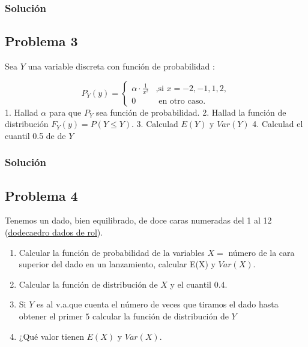 \documentclass[
]{article}
\providecommand{\tightlist}{%
  \setlength{\itemsep}{0pt}\setlength{\parskip}{0pt}}
\begin{document}
\hypertarget{soluciuxf3n-1}{%
\subsubsection{Solución}\label{soluciuxf3n-1}}

\hypertarget{problema-3}{%
\subsection{Problema 3}\label{problema-3}}

Sea \(Y\) una variable discreta con función de probabilidad :

\[
P_Y(y)=
\left\{\begin{array}{ll}
\alpha\cdot\frac{1}{x^2} & \mbox{,si } x=-2,-1,1,2,
 \\
0 & \mbox{ en otro caso}.
\end{array}\right. 
\] 1. Hallad \(\alpha\) para que \(P_Y\) sea función de probabilidad. 2.
Hallad la función de distribución \(F_Y(y)=P(Y\leq Y)\). 3. Calculad
\(E(Y)\) y \(Var(Y)\) 4. Calculad el cuantil 0.5 de de \(Y\)

\hypertarget{soluciuxf3n-2}{%
\subsubsection{Solución}\label{soluciuxf3n-2}}

\hypertarget{problema-4}{%
\subsection{Problema 4}\label{problema-4}}

Tenemos un dado, bien equilibrado, de doce caras numeradas del 1 al 12
(\href{https://es.wikipedia.org/wiki/Dados_de_rol}{dodecaedro dados de
rol}).

\begin{enumerate}
\def\labelenumi{\arabic{enumi}.}
\tightlist
\item
  Calcular la función de probabilidad de la variables \(X=\) número de
  la cara superior del dado en un lanzamiento, calcular E(X) y
  \(Var(X)\).
\item
  Calcular la función de distribución de \(X\) y el cuantil \(0.4\).
\item
  Si \(Y\) es al v.a.que cuenta el número de veces que tiramos el dado
  hasta obtener el primer \(5\) calcular la función de distribución de
  \(Y\)
\item
  ¿Qué valor tienen \(E(X)\) y \(Var(X)\).
\end{enumerate}
\end{document}
